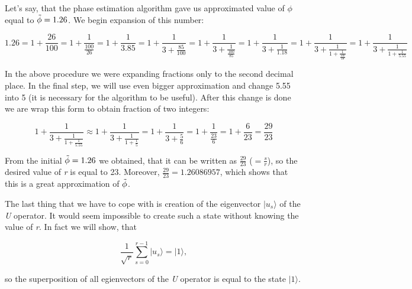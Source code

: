 \begin{example}
Let's say, that the phase estimation algorithm gave us approximated value of $\phi$ equal to $\Tilde{\phi} = 1.26$. We begin expansion of this number:

\[ 1.26 = 1 + \frac{26}{100} = 1 + \frac{1}{\frac{100}{26}} = 1 + \frac{1}{3.85} = 1 + \frac{1}{3 + \frac{85}{100}} = 1 + \frac{1}{3 + \frac{1}{\frac{100}{85}}} = 1 + \frac{1}{3 + \frac{1}{1.18}} = 1 + \frac{1}{3 + \frac{1}{1 + \frac{1}{\frac{100}{18}}}} = 1 + \frac{1}{3 + \frac{1}{1 + \frac{1}{5.55}}}\]

In the above procedure we were expanding fractions only to the second decimal place. In the final step, we will use even bigger approximation and change 5.55 into 5 (it is necessary for the algorithm to be useful). After this change is done we are wrap this form to obtain fraction of two integers:

\[ 1 + \frac{1}{3 + \frac{1}{1 + \frac{1}{5.55}}} \approx 1 + \frac{1}{3 + \frac{1}{1 + \frac{1}{5}}} = 1 + \frac{1}{3 + \frac{5}{6}} = 1 + \frac{1}{\frac{23}{6}} = 1 + \frac{6}{23} = \frac{29}{23}\]

From the initial $\Tilde{\phi} = 1.26$ we obtained, that it can be written as $\frac{29}{23}$ ($ = \frac{s}{r}$), so the desired value of \textit{r} is equal to 23. Moreover, $\frac{29}{23} = 1.26086957$, which shows that this is a great approximation of $\Tilde{\phi}$. 
\end{example}

The last thing that we have to cope with is creation of the eigenvector $|u_s\rangle$ of the \textit{U} operator. It would seem impossible to create such a state without knowing the value of \textit{r}. In fact we will show, that

\[ \frac{1}{\sqrt{r}}\sum_{s = 0}^{r - 1}|u_s\rangle = |1\rangle,\]

so the superposition of all egienvectors of the \textit{U} operator is equal to the state $|1\rangle$.

